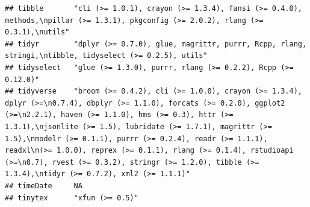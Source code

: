 \documentclass[]{article}
\begin{document}
\begin{verbatim}
## tibble       "cli (>= 1.0.1), crayon (>= 1.3.4), fansi (>= 0.4.0), methods,\npillar (>= 1.3.1), pkgconfig (>= 2.0.2), rlang (>= 0.3.1),\nutils"                                                                                                                                                                                                                                                                                                                                                    
## tidyr        "dplyr (>= 0.7.0), glue, magrittr, purrr, Rcpp, rlang, stringi,\ntibble, tidyselect (>= 0.2.5), utils"                                                                                                                                                                                                                                                                                                                                                                                
## tidyselect   "glue (>= 1.3.0), purrr, rlang (>= 0.2.2), Rcpp (>= 0.12.0)"                                                                                                                                                                                                                                                                                                                                                                                                                          
## tidyverse    "broom (>= 0.4.2), cli (>= 1.0.0), crayon (>= 1.3.4), dplyr (>=\n0.7.4), dbplyr (>= 1.1.0), forcats (>= 0.2.0), ggplot2 (>=\n2.2.1), haven (>= 1.1.0), hms (>= 0.3), httr (>= 1.3.1),\njsonlite (>= 1.5), lubridate (>= 1.7.1), magrittr (>= 1.5),\nmodelr (>= 0.1.1), purrr (>= 0.2.4), readr (>= 1.1.1), readxl\n(>= 1.0.0), reprex (>= 0.1.1), rlang (>= 0.1.4), rstudioapi (>=\n0.7), rvest (>= 0.3.2), stringr (>= 1.2.0), tibble (>= 1.3.4),\ntidyr (>= 0.7.2), xml2 (>= 1.1.1)"
## timeDate     NA                                                                                                                                                                                                                                                                                                                                                                                                                                                                                    
## tinytex      "xfun (>= 0.5)"                                                                                                                                                                                                                                                                                                                                                                                                                                                                       

\end{verbatim}
\end{document}
